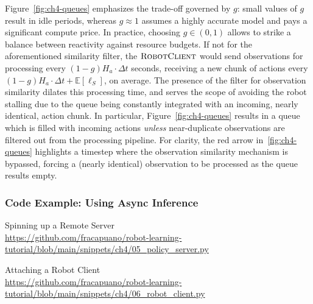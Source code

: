 Figure~\ref{fig:ch4-queues} emphasizes the trade-off governed by \(g\): small values of \( g \) result in idle periods, whereas \(g\approx 1\) assumes a highly accurate model and pays a significant compute price. 
In practice, choosing \(g\in(0,1)\) allows to strike a balance between reactivity against resource budgets.
If not for the aforementioned similarity filter, the \( \textsc{RobotClient} \) would send observations for processing every \( (1 - g) H_a \cdot \Delta t\) seconds, receiving a new chunk of actions every \( (1 - g) H_a \cdot \Delta t + \mathbb E[\ell_S] \), on average. 
The presence of the filter for observation similarity dilates this processing time, and serves the scope of avoiding the robot stalling due to the queue being constantly integrated with an incoming, nearly identical, action chunk. 
In particular, Figure~\ref{fig:ch4-queues} results in a queue which is filled with incoming actions \emph{unless} near-duplicate observations are filtered out from the processing pipeline. 
For clarity, the red arrow in~\ref{fig:ch4-queues} highlights a timestep where the observation similarity mechanism is bypassed, forcing a (nearly identical) observation to be processed as the queue results empty.

\subsubsection{Code Example: Using Async Inference}

\begin{pbox}[label={ex:spinning-up-server}]{Spinning up a Remote Server \\ \url{https://github.com/fracapuano/robot-learning-tutorial/blob/main/snippets/ch4/05_policy_server.py}}
    
\end{pbox}

\begin{pbox}[label={ex:latching-a-robot-client}]{Attaching a Robot Client \\ \url{https://github.com/fracapuano/robot-learning-tutorial/blob/main/snippets/ch4/06_robot_client.py}}
    
\end{pbox}